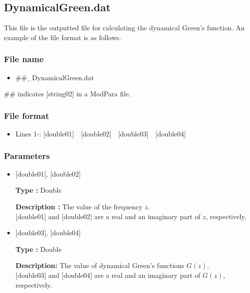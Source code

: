 \newpage
\subsection{{DynamicalGreen.dat}}
\label{Subsec:dynamicalG}
This file is the outputted file for calculating the dynamical Green's function. An example of the file format is as follows.

\subsubsection{File name}
\begin{itemize}
   \item{\#\#\_DynamicalGreen.dat}
\end{itemize}
\#\# indicates [string02] in a ModPara file.
  
\subsubsection{File format}
 \begin{itemize}
   \item  Lines 1-: $[$double01$]$~~$[$double02$]$~~$[$double03$]$~~$[$double04$]$
  \end{itemize}
  
\subsubsection{Parameters}
 \begin{itemize}

 \item  $[$double01$]$, $[$double02$]$

 {\bf Type :} Double

 {\bf Description :} The value of the frequency $z$.\\
$[$double01$]$ and $[$double02$]$ are a real and an imaginary part of $z$, respectively.\\

 \item  $[$double03$]$, $[$double04$]$

 {\bf Type :} Double 

 {\bf Description:} The value of dynamical Green's functions $G(z)$.\\
$[$double03$]$ and $[$double04$]$ are a real and an imaginary part of $G(z)$, respectively.\\

\end{itemize}


